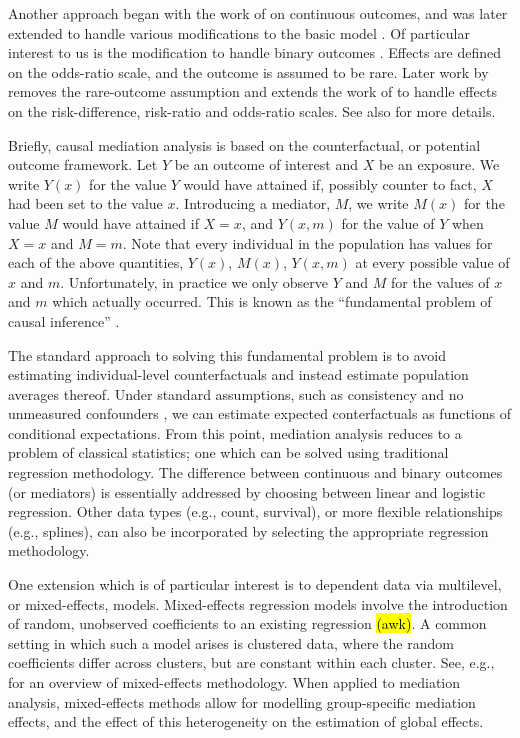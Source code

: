 \documentclass{article}
\begin{document}
Another approach began with the work of \citet{Van09} on continuous outcomes, and was later extended to handle various modifications to the basic model \citep{Van10, Van13, Van14}. Of particular interest to us is the modification to handle binary outcomes \citep{Van10}. Effects are defined on the odds-ratio scale, and the outcome is assumed to be rare. Later work by \citet{Sam21} removes the rare-outcome assumption and extends the work of \citet{Van09} to handle effects on the risk-difference, risk-ratio and odds-ratio scales. See also \citet{Sam18,Sam23} for more details.

Briefly, causal mediation analysis is based on the counterfactual, or potential outcome framework. Let $Y$ be an outcome of interest and $X$ be an exposure. We write $Y(x)$ for the value $Y$ would have attained if, possibly counter to fact, $X$ had been set to the value $x$. Introducing a mediator, $M$, we write $M(x)$ for the value $M$ would have attained if $X=x$, and $Y(x, m)$ for the value of $Y$ when $X=x$ and $M=m$. Note that every individual in the population has values for each of the above quantities, $Y(x)$, $M(x)$, $Y(x,m)$ at every possible value of $x$ and $m$. Unfortunately, in practice we only observe $Y$ and $M$ for the values of $x$ and $m$ which actually occurred. This is known as the ``fundamental problem of causal inference'' \citep{Din18, Hol86}. 

The standard approach to solving this fundamental problem is to avoid estimating individual-level counterfactuals and instead estimate population averages thereof. Under standard assumptions, such as consistency and no unmeasured confounders \citep[see, e.g.,][]{Pea09}, we can estimate expected conterfactuals as functions of conditional expectations. From this point, mediation analysis reduces to a problem of classical statistics; one which can be solved using traditional regression methodology. The difference between continuous and binary outcomes (or mediators) is essentially addressed by choosing between linear and logistic regression. Other data types (e.g., count, survival), or more flexible relationships (e.g., splines), can also be incorporated by selecting the appropriate regression methodology.

One extension which is of particular interest is to dependent data via multilevel, or mixed-effects, models. Mixed-effects regression models involve the introduction of random, unobserved coefficients to an existing regression \hl{(awk)}. A common setting in which such a model arises is clustered data, where the random coefficients differ across clusters, but are constant within each cluster. See, e.g., \citet{Dem04} for an overview of mixed-effects methodology. When applied to mediation analysis, mixed-effects methods allow for modelling group-specific mediation effects, and the effect of this heterogeneity on the estimation of global effects.
\end{document}
